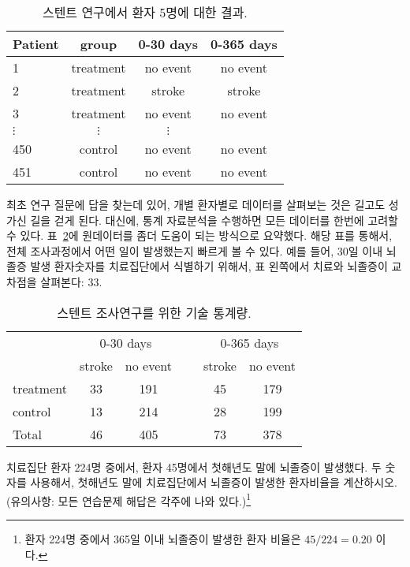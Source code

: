 \begin{table}[h]
\centering
\begin{tabular}{l ccc}
\hline
Patient  &	group	&	0-30 days 	&	0-365 days \\
\hline
1		&	treatment &	no event &	no event \\
2		&	treatment &	stroke & stroke \\
3		&	treatment &	no event & no event \\
$\vdots$	&	$\vdots$	  &	$\vdots$ \\
450	&	control &	no event &	no event \\
451	&	control &	no event &	no event \\
\hline
\end{tabular}
\caption{스텐트 연구에서 환자 5명에 대한 결과.}
\label{stentStudyResultsDF}
\end{table}

최초 연구 질문에 답을 찾는데 있어, 개별 환자별로 데이터를 살펴보는 것은 길고도 성가신 길을 걷게 된다. 대신에, 통계 자료분석을 수행하면 모든 데이터를 한번에 고려할 수 있다.
표~\ref{stentStudyResults}에 원데이터를 좀더 도움이 되는 방식으로 요약했다.
해당 표를 통해서, 전체 조사과정에서 어떤 일이 발생했는지 빠르게 볼 수 있다.
예를 들어, 30일 이내 뇌졸증 발생 환자숫자를 치료집단에서 식별하기 위해서, 표 왼쪽에서 치료와 뇌졸증이 교차점을 살펴본다: 33.


\begin{table}[h]
\centering
\begin{tabular}{l cc c cc}
& \multicolumn{2}{c}{0-30 days} &\hspace{5mm}\ & \multicolumn{2}{c}{0-365 days} \\
  \cline{2-3} \cline{5-6}
	& 	stroke 	& no event && 	stroke 	& no event \\
  \hline
treatment 	& 33		& 191	&&	45 	& 179 \\
control 		& 13		& 214	&& 	28	& 199 \\
  \hline
Total				& 46		& 405	&&	73	& 378 \\
  \hline
\end{tabular}
\caption{스텐트 조사연구를 위한 기술 통계량.}
\label{stentStudyResults}
\end{table}

\begin{exercise}
치료집단 환자 224명 중에서, 환자 45명에서 첫해년도 말에 뇌졸증이 발생했다.
두 숫자를 사용해서, 첫해년도 말에 치료집단에서 뇌졸증이 발생한 환자비율을 계산하시오.
(유의사항: 모든 연습문제 해답은 각주에 나와 있다.)\footnote{환자 224명 중에서 365일 이내 뇌졸증이 발생한 환자 비율은 $45/224 = 0.20$ 이다.}
\end{exercise}

